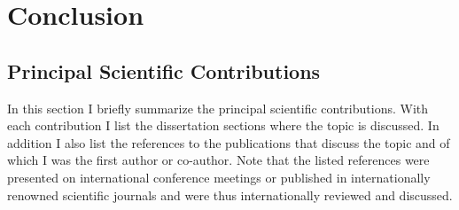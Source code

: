 









\chapter{Conclusion}
\label{ch:conclusion}


\section{Principal Scientific Contributions}
In this section I briefly summarize the principal scientific contributions. With each contribution I list the dissertation sections where the topic is discussed. In addition I also list the references to the publications that discuss the topic and of which I was the first author or co-author. Note that the listed references were presented on international conference meetings or published in internationally renowned scientific journals and were thus internationally reviewed and discussed.
